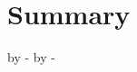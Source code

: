 \documentclass[12pt]{article}
\begin{document}




\section{Summary}
  
%
%
%

\topmargin 0pt
\advance \topmargin by -\headheight
\advance \topmargin by -\headsep

\textheight 8.9in

\oddsidemargin 0pt
\evensidemargin \oddsidemargin
\marginparwidth 0.5in

\textwidth 6.5in
\clearpage
%

 
\end{document}
